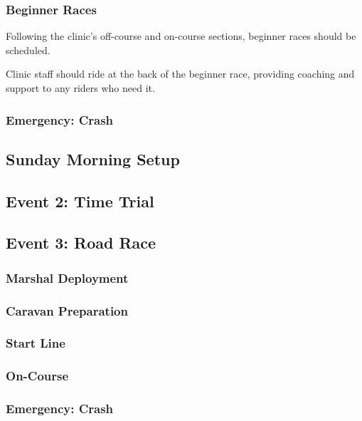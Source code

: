 \documentclass[
  letterpaper, %
  fontsize=10pt, %
  twoside=true,
  chapterentrydots=true, %
  numbers=noenddot,
  fontmethod=tex,
]{kaobook}
\begin{document}
\subsubsection{Beginner Races}

Following the clinic's off-course and on-course sections,
beginner races should be scheduled.


Clinic staff should ride at the back of the beginner race,
providing coaching and support to any riders who need it.


\subsubsection{Emergency: Crash}

\subsection{Sunday Morning Setup}

\subsection{Event 2: Time Trial}

\subsection{Event 3: Road Race}

\subsubsection{Marshal Deployment}

\subsubsection{Caravan Preparation}

\subsubsection{Start Line}

\subsubsection{On-Course}

\subsubsection{Emergency: Crash}
\end{document}
